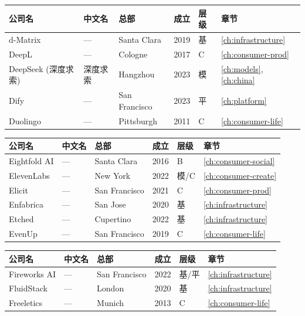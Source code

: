 \bigskip

\nopagebreak
\begin{tabularx}{\textwidth}{@{}l X l l l l@{}}
\toprule
\rowcolor{figLightGray}
\textbf{公司名} & \textbf{中文名} & \textbf{总部} & \textbf{成立} & \textbf{层级} & \textbf{章节} \\
\midrule
d-Matrix            & ---             & Santa Clara   & 2019 & 基   & \ref{ch:infrastructure} \\
DeepL               & ---             & Cologne       & 2017 & C    & \ref{ch:consumer-prod} \\
DeepSeek (深度求索) & 深度求索        & Hangzhou      & 2023 & 模   & \ref{ch:models}, \ref{ch:china} \\
Dify                & ---             & San Francisco & 2023 & 平   & \ref{ch:platform} \\
Duolingo            & ---             & Pittsburgh    & 2011 & C    & \ref{ch:consumer-life} \\
\bottomrule
\end{tabularx}

\bigskip

\nopagebreak
\begin{tabularx}{\textwidth}{@{}l X l l l l@{}}
\toprule
\rowcolor{figLightGray}
\textbf{公司名} & \textbf{中文名} & \textbf{总部} & \textbf{成立} & \textbf{层级} & \textbf{章节} \\
\midrule
Eightfold AI        & ---             & Santa Clara   & 2016 & B    & \ref{ch:consumer-social} \\
ElevenLabs          & ---             & New York      & 2022 & 模/C & \ref{ch:consumer-create} \\
Elicit              & ---             & San Francisco & 2021 & C    & \ref{ch:consumer-prod} \\
Enfabrica           & ---             & San Jose      & 2020 & 基   & \ref{ch:infrastructure} \\
Etched              & ---             & Cupertino     & 2022 & 基   & \ref{ch:infrastructure} \\
EvenUp              & ---             & San Francisco & 2019 & C    & \ref{ch:consumer-life} \\
\bottomrule
\end{tabularx}

\bigskip

\nopagebreak
\begin{tabularx}{\textwidth}{@{}l X l l l l@{}}
\toprule
\rowcolor{figLightGray}
\textbf{公司名} & \textbf{中文名} & \textbf{总部} & \textbf{成立} & \textbf{层级} & \textbf{章节} \\
\midrule
Fireworks AI        & ---             & San Francisco & 2022 & 基/平 & \ref{ch:infrastructure} \\
FluidStack          & ---             & London        & 2020 & 基    & \ref{ch:infrastructure} \\
Freeletics          & ---             & Munich        & 2013 & C     & \ref{ch:consumer-life} \\
\bottomrule
\end{tabularx}

